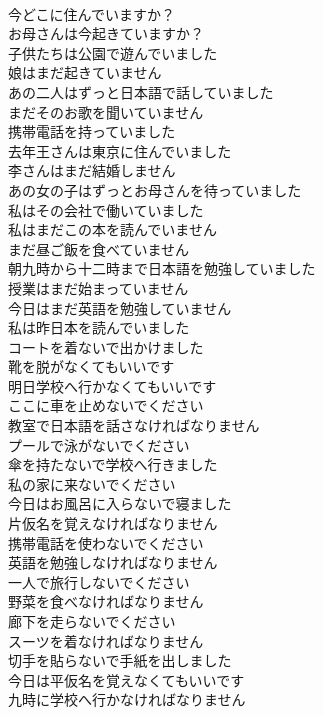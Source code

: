 \documentclass[8pt]{extreport}
\begin{document}
\begin{CJK}{UTF8}{min}
\\	今どこに住んでいますか？	
\\	お母さんは今起きていますか？	
\\	子供たちは公園で遊んでいました	
\\	娘はまだ起きていません	
\\	あの二人はずっと日本語で話していました	
\\	まだそのお歌を聞いていません	
\\	携帯電話を持っていました	
\\	去年王さんは東京に住んでいました	
\\	李さんはまだ結婚しません	
\\	あの女の子はずっとお母さんを待っていました	
\\	私はその会社で働いていました	
\\	私はまだこの本を読んでいません	
\\	まだ昼ご飯を食べていません	
\\	朝九時から十二時まで日本語を勉強していました	
\\	授業はまだ始まっていません	
\\	今日はまだ英語を勉強していません	
\\	私は昨日本を読んでいました	
\\	コートを着ないで出かけました	
\\	靴を脱がなくてもいいです	
\\	明日学校へ行かなくてもいいです	
\\	ここに車を止めないでください	
\\	教室で日本語を話さなければなりません	
\\	プールで泳がないでください	
\\	傘を持たないで学校へ行きました	
\\	私の家に来ないでください	
\\	今日はお風呂に入らないで寝ました	
\\	片仮名を覚えなければなりません	
\\	携帯電話を使わないでください	
\\	英語を勉強しなければなりません	
\\	一人で旅行しないでください	
\\	野菜を食べなければなりません	
\\	廊下を走らないでください	
\\	スーツを着なければなりません	
\\	切手を貼らないで手紙を出しました	
\\	今日は平仮名を覚えなくてもいいです	
\\	九時に学校へ行かなければなりません	

\end{CJK}
\end{document}
